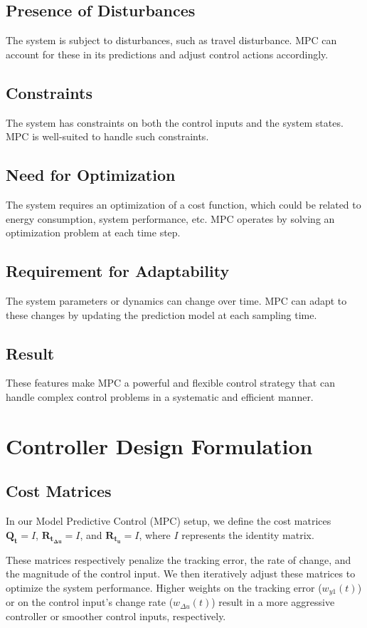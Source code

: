 \documentclass[12pt]{report}
\begin{document}
\section{Presence of Disturbances}
The system is subject to disturbances, such as travel disturbance. MPC can account for these in its predictions and adjust control actions accordingly.

\section{Constraints}
The system has constraints on both the control inputs and the system states. MPC is well-suited to handle such constraints.

\section{Need for Optimization}
The system requires an optimization of a cost function, which could be related to energy consumption, system performance, etc. MPC operates by solving an optimization problem at each time step.

\section{Requirement for Adaptability}
The system parameters or dynamics can change over time. MPC can adapt to these changes by updating the prediction model at each sampling time.

\section*{Result}
These features make MPC a powerful and flexible control strategy that can handle complex control problems in a systematic and efficient manner.

\chapter{Controller Design Formulation}

\section{Cost Matrices}
In our Model Predictive Control (MPC) setup, we define the cost matrices $\mathbf{Q_t} = I$, $\mathbf{R_{t_{\Delta u}}} = I$, and $\mathbf{R_{t_u}} = I$, where $I$ represents the identity matrix. 

These matrices respectively penalize the tracking error, the rate of change, and the magnitude of the control input. We then iteratively adjust these matrices to optimize the system performance. Higher weights on the tracking error ($w_{y1}(t)$) or on the control input's change rate ($w_{\Delta u}(t)$) result in a more aggressive controller or smoother control inputs, respectively.
\end{document}
